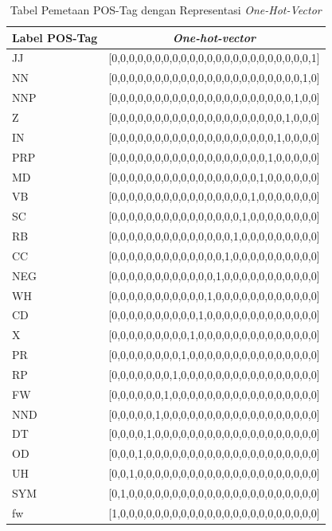 \begin{enumerate}
	\begin{table}
		\centering
		\caption{Tabel Pemetaan POS-Tag dengan Representasi \textit{One-Hot-Vector}}
		\label{table:onehotpostag}
		\begin{tabular}{|l|l|}
			\hline
			\multicolumn{1}{|c|}{Label POS-Tag} & \multicolumn{1}{c|}{\textit{One-hot-vector}} \\ \hline
			JJ & {[}0,0,0,0,0,0,0,0,0,0,0,0,0,0,0,0,0,0,0,0,0,0,0,1{]} \\ \hline
			NN & {[}0,0,0,0,0,0,0,0,0,0,0,0,0,0,0,0,0,0,0,0,0,0,1,0{]} \\ \hline
			NNP & {[}0,0,0,0,0,0,0,0,0,0,0,0,0,0,0,0,0,0,0,0,0,1,0,0{]} \\ \hline
			Z & {[}0,0,0,0,0,0,0,0,0,0,0,0,0,0,0,0,0,0,0,0,1,0,0,0{]} \\ \hline
			IN & {[}0,0,0,0,0,0,0,0,0,0,0,0,0,0,0,0,0,0,0,1,0,0,0,0{]} \\ \hline
			PRP & {[}0,0,0,0,0,0,0,0,0,0,0,0,0,0,0,0,0,0,1,0,0,0,0,0{]} \\ \hline
			MD & {[}0,0,0,0,0,0,0,0,0,0,0,0,0,0,0,0,0,1,0,0,0,0,0,0{]} \\ \hline
			VB & {[}0,0,0,0,0,0,0,0,0,0,0,0,0,0,0,0,1,0,0,0,0,0,0,0{]} \\ \hline
			SC & {[}0,0,0,0,0,0,0,0,0,0,0,0,0,0,0,1,0,0,0,0,0,0,0,0{]} \\ \hline
			RB & {[}0,0,0,0,0,0,0,0,0,0,0,0,0,0,1,0,0,0,0,0,0,0,0,0{]} \\ \hline
			CC & {[}0,0,0,0,0,0,0,0,0,0,0,0,0,1,0,0,0,0,0,0,0,0,0,0{]} \\ \hline
			NEG & {[}0,0,0,0,0,0,0,0,0,0,0,0,1,0,0,0,0,0,0,0,0,0,0,0{]} \\ \hline
			WH & {[}0,0,0,0,0,0,0,0,0,0,0,1,0,0,0,0,0,0,0,0,0,0,0,0{]} \\ \hline
			CD & {[}0,0,0,0,0,0,0,0,0,0,1,0,0,0,0,0,0,0,0,0,0,0,0,0{]} \\ \hline
			X & {[}0,0,0,0,0,0,0,0,0,1,0,0,0,0,0,0,0,0,0,0,0,0,0,0{]} \\ \hline
			PR & {[}0,0,0,0,0,0,0,0,1,0,0,0,0,0,0,0,0,0,0,0,0,0,0,0{]} \\ \hline
			RP & {[}0,0,0,0,0,0,0,1,0,0,0,0,0,0,0,0,0,0,0,0,0,0,0,0{]} \\ \hline
			FW & {[}0,0,0,0,0,0,1,0,0,0,0,0,0,0,0,0,0,0,0,0,0,0,0,0{]} \\ \hline
			NND & {[}0,0,0,0,0,1,0,0,0,0,0,0,0,0,0,0,0,0,0,0,0,0,0,0{]} \\ \hline
			DT & {[}0,0,0,0,1,0,0,0,0,0,0,0,0,0,0,0,0,0,0,0,0,0,0,0{]} \\ \hline
			OD & {[}0,0,0,1,0,0,0,0,0,0,0,0,0,0,0,0,0,0,0,0,0,0,0,0{]} \\ \hline
			UH & {[}0,0,1,0,0,0,0,0,0,0,0,0,0,0,0,0,0,0,0,0,0,0,0,0{]} \\ \hline
			SYM & {[}0,1,0,0,0,0,0,0,0,0,0,0,0,0,0,0,0,0,0,0,0,0,0,0{]} \\ \hline
			fw & {[}1,0,0,0,0,0,0,0,0,0,0,0,0,0,0,0,0,0,0,0,0,0,0,0{]} \\ \hline
		\end{tabular}
	\end{table}
	

\end{enumerate}
